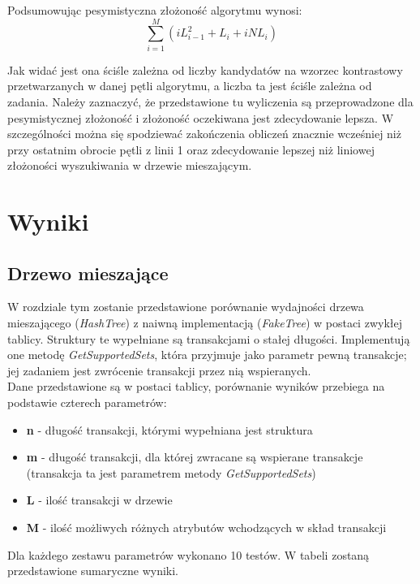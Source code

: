 \documentclass[a4paper,12pt]{article}
\begin{document}
Podsumowując pesymistyczna złożoność algorytmu wynosi:
$$ \sum_{i=1}^M (iL_{i-1}^2 + L_i + iNL_i) $$

Jak widać jest ona ściśle zależna od liczby kandydatów na wzorzec kontrastowy przetwarzanych w danej pętli algorytmu, a liczba ta jest ściśle zależna od zadania. Należy zaznaczyć, że przedstawione tu wyliczenia są przeprowadzone dla pesymistycznej złożoność i złożoność oczekiwana jest zdecydowanie lepsza. W szczególności można się spodziewać zakończenia obliczeń znacznie wcześniej niż przy ostatnim obrocie pętli z linii 1 oraz zdecydowanie lepszej niż liniowej złożoności wyszukiwania w drzewie mieszającym.

\section{Wyniki}

\subsection{Drzewo mieszające}

W rozdziale tym zostanie przedstawione porównanie wydajności drzewa mieszającego (\textit{HashTree}) z naiwną implementacją (\textit{FakeTree}) w postaci zwykłej tablicy. Struktury te wypełniane są transakcjami o stałej długości. Implementują one metodę \textit{GetSupportedSets}, która przyjmuje jako parametr pewną transakcje; jej zadaniem jest zwrócenie transakcji przez nią wspieranych. \\
Dane przedstawione są w postaci tablicy, porównanie wyników przebiega na podstawie czterech parametrów:
\begin{itemize}
\item {\bf n} - długość transakcji, którymi wypełniana jest struktura
\item {\bf m} - długość transakcji, dla której zwracane są wspierane transakcje (transakcja ta jest parametrem metody \textit{GetSupportedSets})
\item {\bf L} - ilość transakcji w drzewie
\item {\bf M} - ilość możliwych różnych atrybutów wchodzących w skład transakcji
\end{itemize}

Dla każdego zestawu parametrów wykonano 10 testów. W tabeli zostaną przedstawione sumaryczne wyniki. \\
\end{document}
